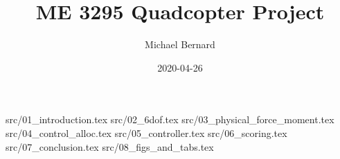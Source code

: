 \documentclass[12pt]{report}
\title{ME 3295 Quadcopter Project}
\author{Michael Bernard}
\date{2020-04-26}
\begin{document}
\maketitle

{src/01_introduction.tex}
{src/02_6dof.tex}
{src/03_physical_force_moment.tex}
{src/04_control_alloc.tex}
{src/05_controller.tex}
{src/06_scoring.tex}
{src/07_conclusion.tex}
{src/08_figs_and_tabs.tex}


\end{document}
